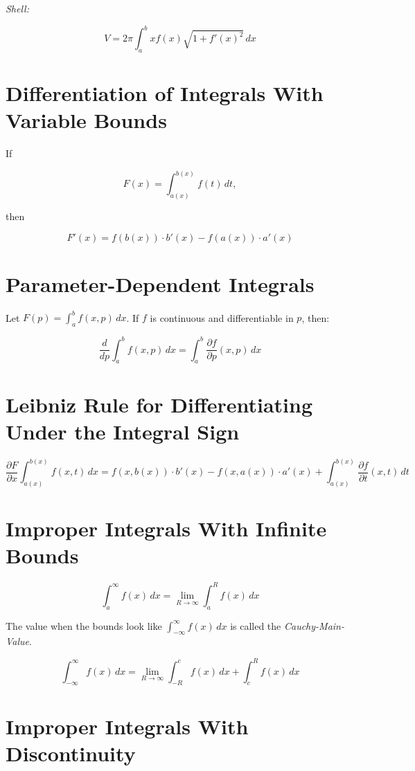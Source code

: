 \emph{Shell:}

\[
    V = 2\pi \int_a^b x f(x) \sqrt{1 + {f'(x)}^2}\,dx
\]

\section{Differentiation of Integrals With Variable Bounds}

If

\[
    F(x) = \int_{a(x)}^{b(x)} f(t)\,dt,
\]

then

\[
    F'(x) = f(b(x)) \cdot b'(x) - f(a(x)) \cdot a'(x)
\]

\section{Parameter-Dependent Integrals}

Let \(F(p) = \int_a^b f(x, p)\,dx\). If \(f\) is continuous and differentiable in \(p\), then:

\[
    \frac{d}{dp} \int_a^b f(x, p)\,dx = \int_a^b \frac{\partial f}{\partial p}(x, p)\,dx
\]

\section{Leibniz Rule for Differentiating Under the Integral Sign}

\[
    \frac{\partial F}{\partial x} \int_{a(x)}^{b(x)} f(x, t)\,dx = f(x, b(x)) \cdot b'(x) - f(x, a(x)) \cdot a'(x) + \int_{a(x)}^{b(x)} 
    \frac{\partial f}{\partial t}(x, t)\,dt
\]

\section{Improper Integrals With Infinite Bounds}

\[
    \int_a^\infty f(x)\,dx = \lim_{R \to \infty} \int_a^R f(x)\,dx
\]

The value when the bounds look like \(\int_{-\infty}^\infty f(x)\,dx \) is called the \emph{Cauchy-Main-Value}.

\[
    \int_{-\infty}^\infty f(x)\,dx = \lim_{R \to \infty} \int_{-R}^{c} f(x)\,dx + \int_{c}^{R} f(x)\,dx
\]

\section{Improper Integrals With Discontinuity}

